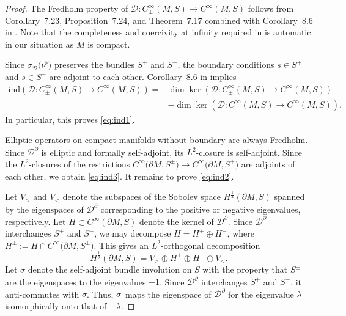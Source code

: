 \documentclass[11pt]{article}
\numberwithin{equation}{section}
\numberwithin{equation}{section}
\begin{document}
\begin{proof}
The Fredholm property of $\mathcal{D}\colon C^\infty_\pm(M,S)\to C^\infty(M,S)$ follows from Corollary~7.23, Proposition~7.24, and Theorem~7.17 combined with Corollary~8.6 in \cite{Baer-Ballmann}.
Note that the completeness and coercivity at infinity required in \cite{Baer-Ballmann} is automatic in our situation as $M$ is compact.

Since $\sigma_{\mathcal{D}}\big(\nu^\flat\big)$ preserves the bundles $S^+$ and $S^-$, the boundary conditions $s\in S^+$ and $s\in S^-$ are adjoint to each other.
Corollary~8.6 in \cite{Baer-Ballmann} implies
\begin{align*}
\mathrm{ind}(\mathcal{D}\colon C^\infty_\pm(M,S)\to C^\infty(M,S))
={}&
\dim\ker(\mathcal{D}\colon C^\infty_\pm(M,S)\to C^\infty(M,S)) \\
& -
\dim\ker(\mathcal{D}\colon C^\infty_\mp(M,S)\to C^\infty(M,S)).
\end{align*}
In particular, this proves \eqref{eq:ind1}.

Elliptic operators on compact manifolds without boundary are always Fredholm.
Since $\mathcal{D}^\partial$ is elliptic and formally self-adjoint, its $L^2$-closure is self-adjoint.
Since the $L^2$-closures of the restrictions $C^\infty\big(\partial M,S^\pm\big)\to C^\infty\big(\partial M,S^\mp\big)$ are adjoints of each other, we obtain \eqref{eq:ind3}.
It remains to prove \eqref{eq:ind2}.

Let $V_>$ and $V_<$ denote the subspaces of the Sobolev space $H^{\frac{1}{2}}(\partial M,S)$ spanned by the eigenspaces of $\mathcal{D}^\partial$ corresponding to the positive or negative eigenvalues, respectively.
Let $H\subset C^\infty(\partial M,S)$ denote the kernel of $\mathcal{D}^\partial$.
Since $\mathcal{D}^\partial$ interchanges $S^+$ and $S^-$, we may decompose $H=H^+\oplus H^-$, where $H^\pm := H\cap C^\infty\big(\partial M,S^\pm\big)$.
This gives an $L^2$-orthogonal decomposition
\[
H^{\frac{1}{2}}(\partial M,S) = V_> \oplus H^+ \oplus H^- \oplus V_< .
\]
Let $\sigma$ denote the self-adjoint bundle involution on $S$ with the property that $S^\pm$ are the eigen\-spaces to the eigenvalues $\pm 1$.
Since $\mathcal{D}^\partial$ interchanges $S^+$ and $S^-$, it anti-commutes with $\sigma$.
Thus, $\sigma$~maps the eigenspace of $\mathcal{D}^\partial$ for the eigenvalue $\lambda$ isomorphically onto that of $-\lambda$.


\end{proof}
\end{document}
